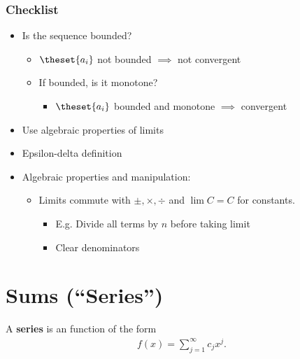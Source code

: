 \hypertarget{checklist}{%
\subsubsection{Checklist}\label{checklist}}

\begin{itemize}
\item
  Is the sequence bounded?

  \begin{itemize}
  \tightlist
  \item
    \(\theset{a_i}\) not bounded \(\implies\) not convergent
  \item
    If bounded, is it monotone?

    \begin{itemize}
    \tightlist
    \item
      \(\theset{a_i}\) bounded and monotone \(\implies\) convergent
    \end{itemize}
  \end{itemize}
\item
  Use algebraic properties of limits
\item
  Epsilon-delta definition
\item
  Algebraic properties and manipulation:

  \begin{itemize}
  \item
    Limits commute with \(\pm, \times, \div\) and \(\lim C = C\) for
    constants.

    \begin{itemize}
    \item
      E.g. Divide all terms by \(n\) before taking limit
    \item
      Clear denominators
    \end{itemize}
  \end{itemize}
\end{itemize}

\hypertarget{sums-series}{%
\section{Sums (``Series'')}\label{sums-series}}

\begin{definition}[Series]

A \textbf{series} is an function of the form
\begin{align*}  
f(x) = \sum_{j=1}^\infty c_j x^j
.\end{align*}

\end{definition}

